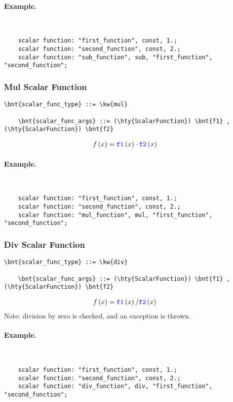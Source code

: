 \paragraph{Example.} \
\begin{verbatim}
    scalar function: "first_function", const, 1.;
    scalar function: "second_function", const, 2.;
    scalar function: "sub_function", sub, "first_function", "second_function";
\end{verbatim}

\subsubsection{Mul Scalar Function}
\begin{Verbatim}[commandchars=\\\{\}]
    \bnt{scalar_func_type} ::= \kw{mul}

    \bnt{scalar_func_args} ::= (\hty{ScalarFunction}) \bnt{f1} , (\hty{ScalarFunction}) \bnt{f2}
\end{Verbatim}
\begin{align}
	f\left( x \right)
	&=
	\textcolor{blue}{\texttt{f1}}\left( x \right) \cdot \textcolor{blue}{\texttt{f2}}\left( x \right)
\end{align}

\paragraph{Example.} \
\begin{verbatim}
    scalar function: "first_function", const, 1.;
    scalar function: "second_function", const, 2.;
    scalar function: "mul_function", mul, "first_function", "second_function";
\end{verbatim}

\subsubsection{Div Scalar Function}
\begin{Verbatim}[commandchars=\\\{\}]
    \bnt{scalar_func_type} ::= \kw{div}

    \bnt{scalar_func_args} ::= (\hty{ScalarFunction}) \bnt{f1} , (\hty{ScalarFunction}) \bnt{f2}
\end{Verbatim}
\begin{align}
	f\left( x \right)
	&=
	\textcolor{blue}{\texttt{f1}}\left( x \right) / \textcolor{blue}{\texttt{f2}}\left( x \right)
\end{align}
Note: division by zero is checked, and an exception is thrown.

\paragraph{Example.} \
\begin{verbatim}
    scalar function: "first_function", const, 1.;
    scalar function: "second_function", const, 2.;
    scalar function: "div_function", div, "first_function", "second_function";
\end{verbatim}



